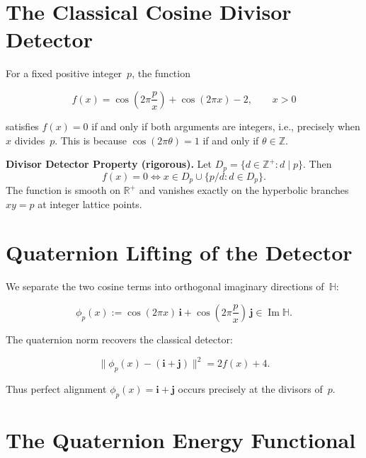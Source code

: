 \documentclass[12pt,a4paper]{article}
\newcommand{\HH}{\mathbb{H}}
\newcommand{\RR}{\mathbb{R}}
\newcommand{\ZZ}{\mathbb{Z}}
\newcommand{\ii}{\mathbf{i}}
\newcommand{\jj}{\mathbf{j}}
\begin{document}
\section{The Classical Cosine Divisor Detector}
\label{sec:divisor}

For a fixed positive integer~$p$, the function

\begin{mathblock}
\[
f(x) = \cos\!\left(2\pi \frac{p}{x}\right) + \cos(2\pi x) - 2, \qquad x > 0
\]
\end{mathblock}

\noindent satisfies $f(x) = 0$ if and only if both arguments are integers, i.e., precisely when $x$ divides~$p$. This is because $\cos(2\pi \theta) = 1$ if and only if $\theta \in \ZZ$.

\begin{definitionbox}
\textbf{Divisor Detector Property (rigorous).}
Let $D_p = \{ d \in \ZZ^+ : d \mid p \}$. Then
\[
f(x) = 0 \iff x \in D_p \cup \{ p/d : d \in D_p \}.
\]
The function is smooth on $\RR^+$ and vanishes exactly on the hyperbolic branches $xy = p$ at integer lattice points.
\end{definitionbox}

\section{Quaternion Lifting of the Detector}
\label{sec:quaternion-lift}

We separate the two cosine terms into orthogonal imaginary directions of~$\HH$:

\begin{mathblock}
\[
\phi_p(x) := \cos(2\pi x)\,\ii + \cos\!\left(2\pi \frac{p}{x}\right)\,\jj \in \operatorname{Im}\HH.
\]
\end{mathblock}

\noindent The quaternion norm recovers the classical detector:

\begin{mathblock}
\[
\|\phi_p(x) - (\ii + \jj)\|^2 = 2f(x) + 4.
\]
\end{mathblock}

\noindent Thus perfect alignment $\phi_p(x) = \ii + \jj$ occurs precisely at the divisors of~$p$.

\section{The Quaternion Energy Functional}
\label{sec:energy}
\end{document}
